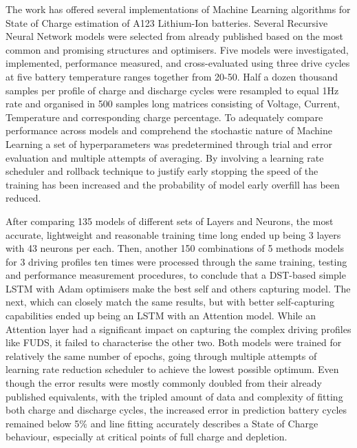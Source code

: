 
%
%
The work has offered several implementations of Machine Learning algorithms for State of Charge estimation of A123 Lithium-Ion batteries.
Several Recursive Neural Network models were selected from already published based on the most common and promising structures and optimisers.
Five models were investigated, implemented, performance measured, and cross-evaluated using three drive cycles at five battery temperature ranges together from 20-50\textdegree{}.
Half a dozen thousand samples per profile of charge and discharge cycles were resampled to equal 1Hz rate and organised in 500 samples long matrices consisting of Voltage, Current, Temperature and corresponding charge percentage.
To adequately compare performance across models and comprehend the stochastic nature of Machine Learning a set of hyperparameters was predetermined through trial and error evaluation and multiple attempts of averaging.
By involving a learning rate scheduler and rollback technique to justify early stopping the speed of the training has been increased and the probability of model early overfill has been reduced.

%
%
After comparing 135 models of different sets of Layers and Neurons, the most accurate, lightweight and reasonable training time long ended up being 3 layers with 43 neurons per each.
Then, another 150 combinations of 5 methods models for 3 driving profiles ten times were processed through the same training, testing and performance measurement procedures, to conclude that a DST-based simple LSTM with Adam optimisers make the best self and others capturing model.
The next, which can closely match the same results, but with better self-capturing capabilities ended up being an LSTM with an Attention model.
While an Attention layer had a significant impact on capturing the complex driving profiles like FUDS, it failed to characterise the other two.
Both models were trained for relatively the same number of epochs, going through multiple attempts of learning rate reduction scheduler to achieve the lowest possible optimum.
Even though the error results were mostly commonly doubled from their already published equivalents, with the tripled amount of data and complexity of fitting both charge and discharge cycles, the increased error in prediction battery cycles remained below 5\% and line fitting accurately describes a State of Charge behaviour, especially at critical points of full charge and depletion.

